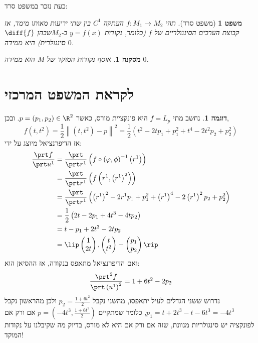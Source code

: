 \documentclass{article}
\newtheorem*{corollary*}{מסקנה}
\newtheorem*{theorem*}{משפט}
\theoremstyle{definition}
\newtheorem*{example*}{דוגמה}
\newcommand{\norm}[1]{\left\lVert#1\right\rVert}
\begin{document}
	כעת נזכר במשפט סרד:
	\begin{theorem*}[משפט סרד]
		תהי
		\(f:M_1\to M_2\)
		העתקה
		\(C^1\)
		בין שתי יריעות מאותו מימד,
		אז קבוצת הערכים הסינגולריים של \(f\)
		(כלומר, נקודות \(y=f(x)\) ב-\(M_2\)שבהן \(\diff{f}\) סינגולרית)
		היא ממידה \(0\).
	\end{theorem*}

	\begin{corollary*}
		אוסף נקודות המוקד של \(M\) הוא ממידה \(0\).
	\end{corollary*}




	\section{לקראת המשפט המרכזי}
	\begin{example*}
		נחשב מתי
		\(f=L_p\)
		היא פונקציית מורס, כאשר
		\(p=(p_1,p_2)\in \R^2\).
		ובכן,
		\[
			f(t,t^2)
			=\frac{1}{2}\norm{(t,t^2)-p}^2
			=\frac{1}{2}\left(t^2-2tp_1+p_1^2+t^4-2t^2p_2+p_2^2\right)
		\]
		אז הדיפרנציאל מיוצג על ידי:
		\begin{equation*}\begin{split}
			\frac{\prt f}{\prt u^1}
			&=\frac{\prt}{\prt r^1}\left(f\circ\left(\varphi,\phi\right)^{-1}\left(r^1\right)\right)
			\\&=\frac{\prt}{\prt r^1}\left(f\left(r^1,\left(r^1\right)^2\right)\right)
			\\&=\frac{\prt}{\prt r^1}\left(\left(r^1\right)^2-2r^1 p_1+p_1^2+\left(r^1\right)^4-2\left(r^1\right)^2p_2+p_2^2\right)
			\\&=\frac{1}{2}\left(2t-2p_1+4t^3-4tp_2\right)
			\\&=t-p_1+2t^3-2tp_2
			\\&=\lip
				\begin{pmatrix}
					1 \\ 2t
				\end{pmatrix},
				\begin{pmatrix}
					t \\ t^2
				\end{pmatrix}
				-\begin{pmatrix}
				p_1 \\ p_2
				\end{pmatrix}
			\rip
		\end{split}\end{equation*}
		ואם הדיפרנציאל מתאפס בנקודה, אז ההסיאן הוא:
		\[
			\frac{\prt^2 f}{\prt \left(u^1\right)^2}
			=1+6t^2-2p_2
		\]
		נדרוש ששני הגדלים לעיל יתאפסו, מהשני נקבל
		\(p_2=\frac{1+6t^2}{2}\)
		ולכן מהראשון נקבל
		\(p_1=t+2t^3-t-6t^3=-4t^3\),
		כלומר שמתקיים
		\(p=\left(-4t^3,\frac{1+6t^2}{2}\right)\)
		אם ורק אם לפונקציה יש סינגולריות מנוונת, שזה אם ורק אם היא לא מורס,
		בדיוק מה שקיבלנו על נקודות המוקד!
	\end{example*}
\end{document}
